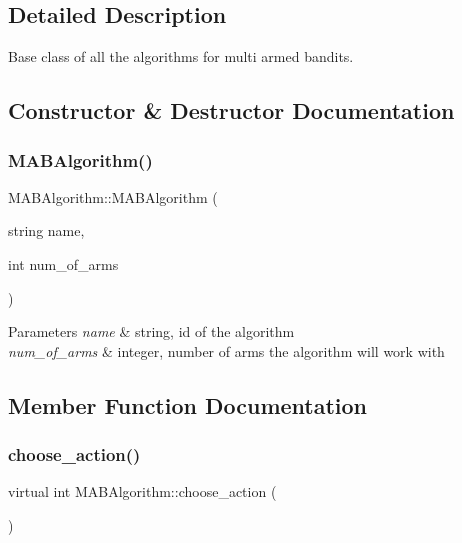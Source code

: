 \subsection{Detailed Description}
Base class of all the algorithms for multi armed bandits. 

\subsection{Constructor \& Destructor Documentation}
\mbox{\label{class_m_a_b_algorithm_a9a938041685a1912995d427027971de4}} 
\subsubsection{\texorpdfstring{M\+A\+B\+Algorithm()}{MABAlgorithm()}}
{\footnotesize\ttfamily M\+A\+B\+Algorithm\+::\+M\+A\+B\+Algorithm (\begin{DoxyParamCaption}\item[{string}]{name,  }\item[{int}]{num\+\_\+of\+\_\+arms }\end{DoxyParamCaption})}


\begin{DoxyParams}{Parameters}
{\em name} & string, id of the algorithm \\
\hline
{\em num\+\_\+of\+\_\+arms} & integer, number of arms the algorithm will work with \\
\hline
\end{DoxyParams}


\subsection{Member Function Documentation}
\mbox{\label{class_m_a_b_algorithm_afb48f01df0e1860d19759f6e20335007}} 
\subsubsection{\texorpdfstring{choose\+\_\+action()}{choose\_action()}}
{\footnotesize\ttfamily virtual int M\+A\+B\+Algorithm\+::choose\+\_\+action (\begin{DoxyParamCaption}{ }\end{DoxyParamCaption})\hspace{0.3cm}{\ttfamily [pure virtual]}}

